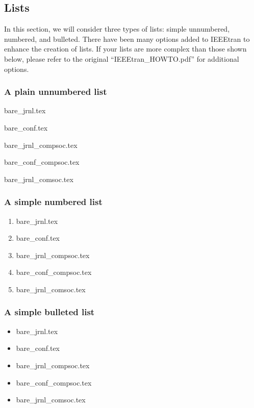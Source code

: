 \documentclass[lettersize,journal]{IEEEtran}
\begin{document}
\subsection{Lists}
In this section, we will consider three types of lists: simple unnumbered, numbered, and bulleted. There have been many options added to IEEEtran to enhance the creation of lists. If your lists are more complex than those shown below, please refer to the original ``IEEEtran\_HOWTO.pdf'' for additional options.\\

\subsubsection*{\bf A plain  unnumbered list}
\begin{list}{}{}
\item{bare\_jrnl.tex}
\item{bare\_conf.tex}
\item{bare\_jrnl\_compsoc.tex}
\item{bare\_conf\_compsoc.tex}
\item{bare\_jrnl\_comsoc.tex}
\end{list}

\subsubsection*{\bf A simple numbered list}
\begin{enumerate}
\item{bare\_jrnl.tex}
\item{bare\_conf.tex}
\item{bare\_jrnl\_compsoc.tex}
\item{bare\_conf\_compsoc.tex}
\item{bare\_jrnl\_comsoc.tex}
\end{enumerate}

\subsubsection*{\bf A simple bulleted list}
\begin{itemize}
\item{bare\_jrnl.tex}
\item{bare\_conf.tex}
\item{bare\_jrnl\_compsoc.tex}
\item{bare\_conf\_compsoc.tex}
\item{bare\_jrnl\_comsoc.tex}
\end{itemize}
\end{document}
